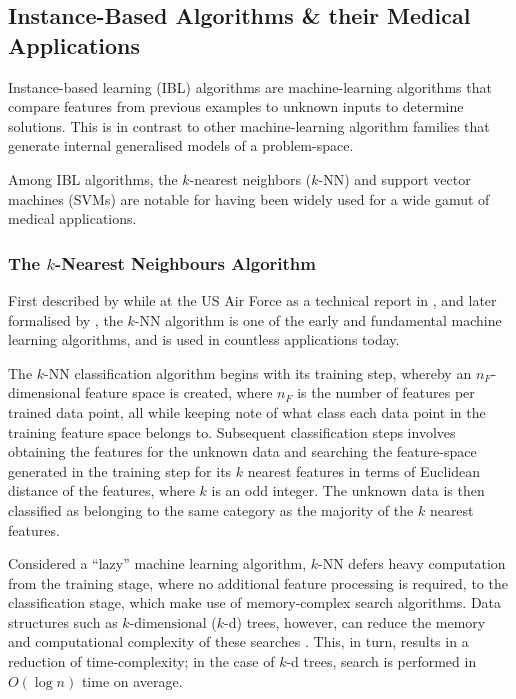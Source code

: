 \subsection{Instance-Based Algorithms \& their Medical Applications}

Instance-based learning (IBL) algorithms are machine-learning algorithms that compare features from previous examples to unknown inputs to determine solutions. This is in contrast to other machine-learning algorithm families that generate internal generalised models of a problem-space.


Among IBL algorithms, the $k$-nearest neighbors ($k$-NN) and support vector machines (SVMs) are notable for having been widely used for a wide gamut of medical applications.

\subsubsection{The $k$-Nearest Neighbours Algorithm}

First described by \citeauthor{fix1951} while at the US Air Force as a technical report in \citeyear{fix1951}, and later formalised by \citeauthor{hart1967}, the $k$-NN algorithm is one of the early and fundamental machine learning algorithms, and is used in countless applications today.

The $k$-NN classification algorithm begins with its training step, whereby an $n_F$-dimensional feature space is created, where $n_F$ is the number of features per trained data point, all while keeping note of what class each data point in the training feature space belongs to. Subsequent classification steps involves obtaining the features for the unknown data and searching the feature-space generated in the training step for its $k$ nearest features in terms of Euclidean distance of the features, where $k$ is an odd integer. The unknown data is then classified as belonging to the same category as the majority of the $k$ nearest features.

Considered a ``lazy'' machine learning algorithm, $k$-NN defers heavy computation from the training stage, where no additional feature processing is required, to the classification stage, which make use of memory-complex search algorithms. Data structures such as $k\textrm{-dimensional}$ ($k$-d) trees, however, can reduce the memory and computational complexity of these searches \citep{otair2013}. This, in turn, results in a reduction of time-complexity; in the case of $k$-d trees, search is performed in $O(\log n)$ time on average.

